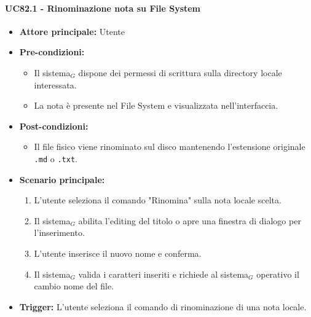 \documentclass[a4paper, 10pt]{article}
\begin{document}
\paragraph{UC82.1 - Rinominazione nota su File System}
\hypertarget{uc:82.1}{}
\begin{itemize}
    \item \textbf{Attore principale:} Utente
    \item \textbf{Pre-condizioni:} 
        \begin{itemize}
            \item Il sistema$_G$ dispone dei permessi di scrittura sulla directory locale interessata.
            \item La nota è presente nel File System e visualizzata nell'interfaccia.
        \end{itemize}
    \item \textbf{Post-condizioni:} 
        \begin{itemize}
            \item Il file fisico viene rinominato sul disco mantenendo l'estensione originale \texttt{.md} o \texttt{.txt}.
        \end{itemize}
    \item \textbf{Scenario principale:}
        \begin{enumerate}
            \item L'utente seleziona il comando "Rinomina" sulla nota locale scelta.
            \item Il sistema$_G$ abilita l'editing del titolo o apre una finestra di dialogo per l'inserimento.
            \item L'utente inserisce il nuovo nome e conferma.
            \item Il sistema$_G$ valida i caratteri inseriti e richiede al sistema$_G$ operativo il cambio nome del file.
        \end{enumerate}
    \item \textbf{Trigger:} L'utente seleziona il comando di rinominazione di una nota locale.
\end{itemize}
\end{document}
